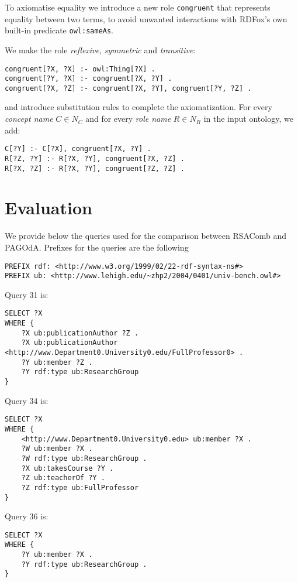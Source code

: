 \documentclass[runningheads]{llncs}
\newcommand{\pagoda}{\mbox{PAGOdA}\xspace}
\newcommand{\rdfox}{\mbox{RDFox}\xspace}
\newcommand{\rsacomb}{\mbox{RSAComb}\xspace}
\begin{document}
To axiomatise equality we introduce a new role \texttt{congruent} that represents equality between two terms, to avoid unwanted interactions with \rdfox's own built-in predicate \texttt{owl:sameAs}.

We make the role \emph{reflexive}, \emph{symmetric} and \emph{transitive}:

\begin{verbatim}
congruent[?X, ?X] :- owl:Thing[?X] .
congruent[?Y, ?X] :- congruent[?X, ?Y] .
congruent[?X, ?Z] :- congruent[?X, ?Y], congruent[?Y, ?Z] .
\end{verbatim}

and introduce substitution rules to complete the axiomatization.
For every \emph{concept name} $C \in N_C$ and for every \emph{role name} $R \in N_R$ in the input ontology, we add:

\begin{verbatim}
C[?Y] :- C[?X], congruent[?X, ?Y] .
R[?Z, ?Y] :- R[?X, ?Y], congruent[?X, ?Z] .
R[?X, ?Z] :- R[?X, ?Y], congruent[?Z, ?Z] .
\end{verbatim}

\section{Evaluation}\label{apx:evaluation}
 
We provide below the queries used for the comparison between \rsacomb and \pagoda.
Prefixes for the queries are the following

\begin{verbatim}
PREFIX rdf: <http://www.w3.org/1999/02/22-rdf-syntax-ns#>
PREFIX ub: <http://www.lehigh.edu/~zhp2/2004/0401/univ-bench.owl#>
\end{verbatim}

\noindent Query 31 is:
\begin{verbatim}
SELECT ?X
WHERE {
    ?X ub:publicationAuthor ?Z .
    ?X ub:publicationAuthor <http://www.Department0.University0.edu/FullProfessor0> .
    ?Y ub:member ?Z .
    ?Y rdf:type ub:ResearchGroup
}
\end{verbatim}

\noindent Query 34 is:
\begin{verbatim}
SELECT ?X
WHERE {
    <http://www.Department0.University0.edu> ub:member ?X .
    ?W ub:member ?X .
    ?W rdf:type ub:ResearchGroup .
    ?X ub:takesCourse ?Y .
    ?Z ub:teacherOf ?Y .
    ?Z rdf:type ub:FullProfessor
}
\end{verbatim}

\noindent Query 36 is:
\begin{verbatim}
SELECT ?X
WHERE {
    ?Y ub:member ?X .
    ?Y rdf:type ub:ResearchGroup .
}
\end{verbatim}
\end{document}
